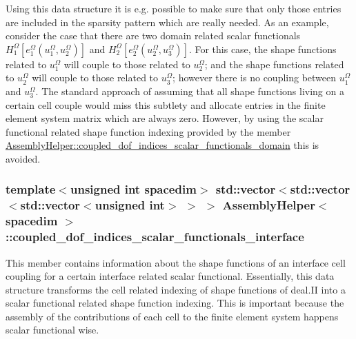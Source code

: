 Using this data structure it is e.\+g. possible to make sure that only those entries are included in the sparsity pattern which are really needed. As an example, consider the case that there are two domain related scalar functionals $H^\Omega_1[e^\Omega_1(u^\Omega_1, u^\Omega_2)]$ and $H^\Omega_2[e^\Omega_2(u^\Omega_2, u^\Omega_3)]$. For this case, the shape functions related to $u^\Omega_1$ will couple to those related to $u^\Omega_2$; and the shape functions related to $u^\Omega_2$ will couple to those related to $u^\Omega_3$; however there is no coupling between $u^\Omega_1$ and $u^\Omega_3$. The standard approach of assuming that all shape functions living on a certain cell couple would miss this subtlety and allocate entries in the finite element system matrix which are always zero. However, by using the scalar functional related shape function indexing provided by the member \hyperlink{class_assembly_helper_a1a26b40224e3f04e5168accc91486493}{Assembly\+Helper\+::coupled\+\_\+dof\+\_\+indices\+\_\+scalar\+\_\+functionals\+\_\+domain} this is avoided. 
\subsubsection[{\texorpdfstring{coupled\+\_\+dof\+\_\+indices\+\_\+scalar\+\_\+functionals\+\_\+interface}{coupled_dof_indices_scalar_functionals_interface}}]{\setlength{\rightskip}{0pt plus 5cm}template$<$unsigned int spacedim$>$ std\+::vector$<$std\+::vector$<$std\+::vector$<$unsigned int$>$ $>$ $>$ {\bf Assembly\+Helper}$<$ spacedim $>$\+::coupled\+\_\+dof\+\_\+indices\+\_\+scalar\+\_\+functionals\+\_\+interface\hspace{0.3cm}{\ttfamily [private]}}\hypertarget{class_assembly_helper_ab346e146cf91fb7a0688076551b37355}{}\label{class_assembly_helper_ab346e146cf91fb7a0688076551b37355}
This member contains information about the shape functions of an interface cell coupling for a certain interface related scalar functional. Essentially, this data structure transforms the cell related indexing of shape functions of deal.\+II into a scalar functional related shape function indexing. This is important because the assembly of the contributions of each cell to the finite element system happens scalar functional wise.

